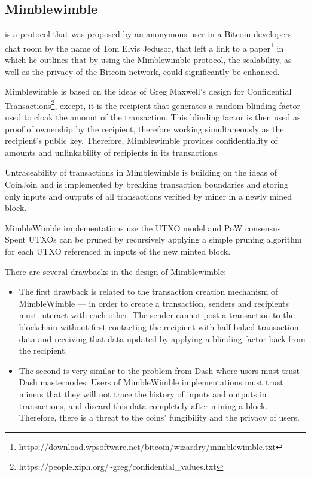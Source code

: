 \documentclass[8pt,fleqn,openany]{book}
\begin{document}
{		\subsection{Mimblewimble} is a protocol that was proposed by an anonymous user in a Bitcoin developers chat room by the name of Tom Elvis Jedusor, that left a link to a paper\footnote{https://download.wpsoftware.net/bitcoin/wizardry/mimblewimble.txt} in which he outlines that by using the Mimblewimble protocol, the scalability, as well as the privacy of the Bitcoin network, could significantly be enhanced.
		
		Mimblewimble is based on the ideas of Greg Maxwell’s design for Confidential Transactions\footnote{https://people.xiph.org/\texttt{\~}greg/confidential\_values.txt}, except, it is the recipient that generates a random blinding factor used to cloak the amount of the transaction. This blinding factor is then used as proof of ownership by the recipient, therefore working simultaneously as the recipient’s public key. Therefore, Mimblewimble provides confidentiality of amounts and unlinkability of recipients in its transactions.
		
		Untraceability of transactions in Mimblewimble is building on the ideas of CoinJoin and is implemented by breaking transaction boundaries and storing only inputs and outputs of all transactions verified by miner in a newly mined block.
		
		MimbleWimble implementations use the UTXO model and PoW consensus. Spent UTXOs can be pruned by recursively applying a simple pruning algorithm for each UTXO referenced in inputs of the new minted block.
		
		There are several drawbacks in the design of Mimblewimble:
		
		\begin{itemize}
			\item {The first drawback is related to the transaction creation mechanism of MimbleWimble — in order to create a transaction, senders and recipients must interact with each other. The sender cannot post a transaction to the blockchain without first contacting the recipient with half-baked transaction data and receiving that data updated by applying a blinding factor back from the recipient.}
			\item {The second is very similar to the problem from Dash where users must trust Dash masternodes. Users of MimbleWimble implementations must trust miners that they will not trace the history of inputs and outputs in transactions, and discard this data completely after mining a block. Therefore, there is a threat to the coins’ fungibility and the privacy of users.}
		\end{itemize}
		
}
\end{document}
